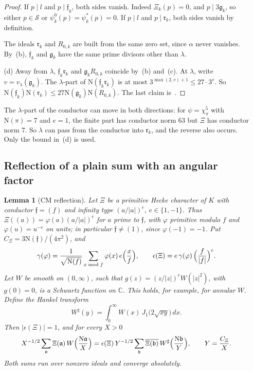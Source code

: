 \documentclass[11pt]{article}
\numberwithin{equation}{section}
\newcommand{\N}{\mathrm N}
\newtheorem{lemma}{Lemma}
\begin{document}
\begin{proof}
If $p\mid l$ and $p\mid\mathfrak f_k$, both sides vanish. Indeed $\Xi_k(p)=0$, and $p\mid3\mathfrak g_k$,
so either $p\in\mathcal S$ or $\psi_k^0(p)=\psi_k^*(p)=0$. If $p\mid l$ and $p\mid\mathfrak r_k$, both sides
vanish by definition.

The ideals $\mathfrak r_k$ and $R_{0,k}$ are built from the same zero set, since $\alpha$ never vanishes.
By~(b), $\mathfrak f_k$ and $\mathfrak g_k$ have the same prime divisors other than $\lambda$.

(d) Away from $\lambda$, $\mathfrak f_k\mathfrak r_k$ and $\mathfrak g_kR_{0,k}$ coincide by~(b) and~(c).
At $\lambda$, write $v=v_\lambda(\mathfrak g_k)$. The $\lambda$-part of $\N(\mathfrak f_k\mathfrak r_k)$ is
at most $3^{\max(2,v)+1}\le27\cdot3^v$. So $\N(\mathfrak f_k)\N(\mathfrak r_k)\le27\N(\mathfrak g_k)\N(R_{0,k})$.
The last claim is~\cite[eq.~(18.7), Section~18.1]{OAI78}.
\end{proof}

The $\lambda$-part of the conductor can move in both directions: for $\psi=\chi_\pi^5$ with $\N(\pi)=7$
and $e=1$, the finite part has conductor norm $63$ but $\Xi$ has conductor norm $7$. So $\lambda$ can pass
from the conductor into $\mathfrak r_k$, and the reverse also occurs. Only the bound in~(d) is used.

\subsection{Reflection of a plain sum with an angular factor}\label{sec:s5-reflection}

\begin{lemma}[CM reflection]\label{lem:s5-reflection}
Let $\Xi$ be a primitive Hecke character of $K$ with conductor $\mathfrak f=(f)$ and infinity type
$(a/|a|)^e$, $e\in\{1,-1\}$. Thus $\Xi((a))=\varphi(a)(a/|a|)^e$ for $a$ prime to $\mathfrak f$, with
$\varphi$ primitive modulo $f$ and $\varphi(u)=u^{-e}$ on units; in particular $\mathfrak f\ne(1)$, since
$\varphi(-1)=-1$. Put $C_\Xi=3\N(\mathfrak f)/(4\pi^2)$, and
\begin{equation}\label{eq:s5-root}
 \gamma(\varphi)=\frac1{\sqrt{\N(f)}}\sum_{x\bmod f}\varphi(x)\,e\Bigl(\frac xf\Bigr),\qquad
 \epsilon(\Xi)=e\,\gamma(\varphi)\,\Bigl(\frac f{|f|}\Bigr)^e .
\end{equation}
Let $W$ be smooth on $(0,\infty)$, such that $g(z)=(z/|z|)^eW(|z|^2)$, with $g(0)=0$, is a Schwartz
function on $\mathbb C$. This holds, for example, for annular $W$. Define the Hankel transform~\cite[\S10.22(v)]{DLMF}
\begin{equation}\label{eq:s5-sharp-def}
 W^\sharp(y)=\int_0^\infty W(x)\,J_1\bigl(2\sqrt{xy}\bigr)\,dx .
\end{equation}
Then $|\epsilon(\Xi)|=1$, and for every $X>0$
\begin{equation}\label{eq:s5-reflection}
 X^{-1/2}\sum_{\mathfrak a}\Xi(\mathfrak a)\,W\Bigl(\frac{\N\mathfrak a}X\Bigr)
 =\epsilon(\Xi)\,Y^{-1/2}\sum_{\mathfrak b}\overline{\Xi(\mathfrak b)}\,W^\sharp\Bigl(\frac{\N\mathfrak b}Y\Bigr),
 \qquad Y=\frac{C_\Xi}X .
\end{equation}
Both sums run over nonzero ideals and converge absolutely.
\end{lemma}
\end{document}
